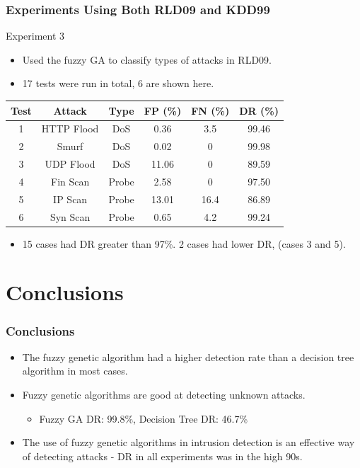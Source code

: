 \documentclass{beamer}
\begin{document}
\begin{frame}
	\frametitle{Experiments Using Both RLD09 and KDD99}
Experiment 3
	\begin{itemize}
		\item Used the fuzzy GA to classify types of attacks in RLD09.
		\item 17 tests were run in total, 6 are shown here.
	\end{itemize}
\begin{table}
\begin{tabular}{cccccc}
Test & Attack & Type & FP (\%) & FN (\%) & DR (\%)\\ \hline
1 & HTTP Flood & DoS & 0.36 & 3.5 & 99.46\\
2 & Smurf & DoS & 0.02 & 0 & 99.98\\
3 & UDP Flood & DoS & 11.06 & 0 & 89.59\\
4 & Fin Scan & Probe & 2.58 & 0 & 97.50\\
5 & IP Scan & Probe & 13.01 & 16.4 & 86.89\\
6 & Syn Scan & Probe & 0.65 & 4.2 & 99.24\\
\end{tabular}
\end{table}

\begin{itemize}
	\item 15 cases had DR greater than 97\%. 2 cases had lower DR, (cases 3 and 5).
\end{itemize}

\end{frame}
\section[Conclusions]{Conclusions}

\begin{frame}
\frametitle{Conclusions}
	\begin{itemize}
		\item The fuzzy genetic algorithm had a higher detection rate than a decision tree algorithm in most cases.
		\item Fuzzy genetic algorithms are good at detecting unknown attacks.
		\begin{itemize}
			\item Fuzzy GA DR: 99.8\%, Decision Tree DR: 46.7\%
		\end{itemize}

		\item The use of fuzzy genetic algorithms in intrusion detection is an effective way of detecting attacks - DR in all experiments was in the high 90s.
	\end{itemize}
\end{frame}
\end{document}
